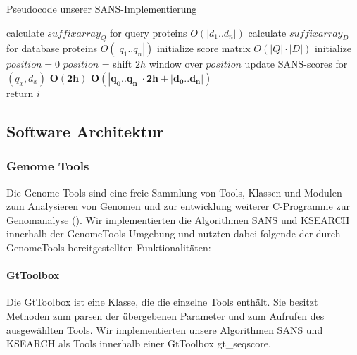 \documentclass{article}
\begin{document}
\begin{algorithm}
  \caption{Pseudocode unserer SANS-Implementierung}
 \begin{algorithmic}
     \State calculate $suffixarray_Q$ for query proteins \Comment $O(|d_1..d_n|)$
     \State calculate $suffixarray_D$ for database proteins \Comment $O(|q_1..q_n|)$
     \State initialize score matrix \Comment $O(|Q|\cdot|D|)$
     \State initialize $position = 0$
       \State  $position$ =  
       \State shift $2h$ window over $position$ 
         \State update SANS-scores for  $(q_x,d_x)$
       \EndFor \Comment $\mathbf{O(2h)}$
     \EndFor \Comment $\mathbf{O(|q_0..q_n|\cdot2h + |d_0..d_n|)}$
    \EndFunction  {}   \\
    
          \State return $i$ 
        \EndIf
      \EndFor 
    \EndFunction
  \end{algorithmic}
\end{algorithm}

\subsection{Software Architektur}

\subsubsection{Genome Tools}

Die Genome Tools sind eine freie Sammlung von Tools, Klassen und Modulen zum Analysieren von Genomen und zur entwicklung weiterer C-Programme zur Genomanalyse (\cite{gtools}). Wir implementierten die Algorithmen SANS und KSEARCH innerhalb der GenomeTools-Umgebung und nutzten dabei folgende der durch GenomeTools bereitgestellten Funktionalitäten:

\paragraph{GtToolbox}
Die GtToolbox ist eine Klasse, die die einzelne Tools enthält. Sie besitzt Methoden zum parsen der übergebenen Parameter und zum Aufrufen des ausgewählten Tools. Wir implementierten unsere Algorithmen SANS und KSEARCH als Tools innerhalb einer GtToolbox gt\_seqscore. 
\end{document}
